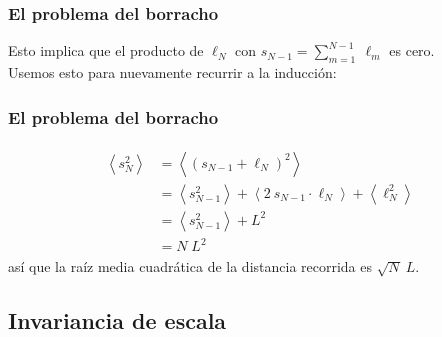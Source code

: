 \documentclass[12pt]{beamer}
\begin{document}
\begin{frame}
\frametitle{El problema del borracho}
Esto implica que el producto de $\ell_{N}$ con $s_{N - 1} = \sum_{m = 1}^{N - 1} \: \ell_{m}$ es cero.
\\
\bigskip
\pause
Usemos esto para nuevamente recurrir a la inducción:
\end{frame}
\begin{frame}
\frametitle{El problema del borracho}
\begin{align}
\begin{aligned}
\left\langle s_{N}^{2} \right\rangle &= \left\langle (s_{N - 1} + \ell_{N})^{2} \right\rangle \\
&=  \left\langle s_{N -1}^{2} \right\rangle + \left\langle 2 \: s_{N - 1} \cdot \ell_{N} \right\rangle + \left\langle \ell_{N}^{2} \right\rangle \\
&= \left\langle s_{N - 1}^{2} \right\rangle + L^{2} \\
&= N \; L^{2}
\end{aligned}
\label{eq:ecuacion_02_06}
\end{align}
\pause
así que la raíz media cuadrática de la distancia recorrida es $\sqrt{N} \: L$.
\end{frame}

\subsection*{Invariancia de escala}
\end{document}
